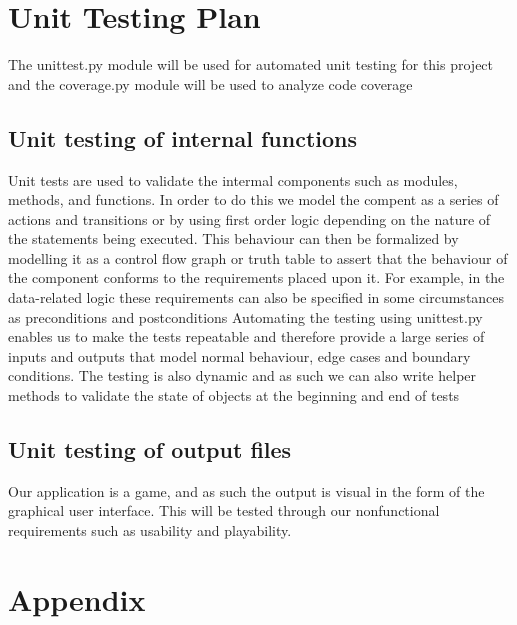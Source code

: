 \documentclass[12pt, titlepage]{article}
\begin{document}
	
	\section{Unit Testing Plan}
	The unittest.py module will be used for automated unit testing for this
	project and the coverage.py module will be used to analyze code coverage

	\subsection{Unit testing of internal functions}
	Unit tests are used to validate the intermal components such as modules, 
	methods, and functions. In order to do this we model the compent as a series of
	actions and transitions or by using first order logic depending on the nature of
	the statements being executed. This behaviour can then be formalized by
	modelling it as a control flow graph or truth table to assert that the
	behaviour of the component conforms to the requirements placed upon it.
	For example, in the data-related logic these requirements can also be
	specified in some circumstances as preconditions and postconditions \newline
	Automating the testing using unittest.py enables us to make the tests
	repeatable and therefore provide a large series of inputs and outputs that
	model normal behaviour, edge cases and boundary conditions. The testing is also
	dynamic and as such we can also write helper methods to validate the state of
	objects at the beginning and end of tests
	
	\subsection{Unit testing of output files}	
	Our application is a game, and as such the output is visual in the form of the
	graphical user interface. This will be tested through our nonfunctional
	requirements such as usability and playability.

	
	
	\newpage
	\section{Appendix}
\end{document}
